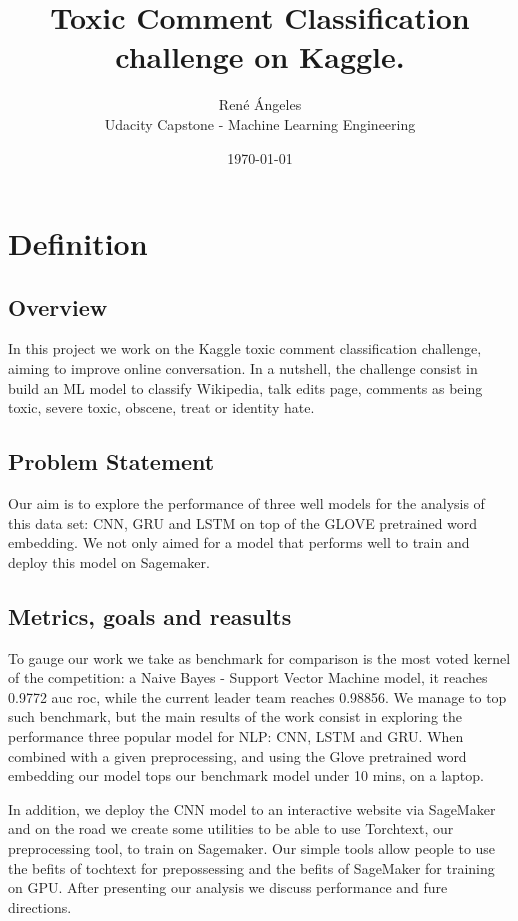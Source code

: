 \documentclass[book,preprintnumbers,11pt]{article}
\begin{document}
\title{Toxic Comment Classification challenge on Kaggle.}
\author{Ren\'e  \'Angeles\\
  Udacity Capstone - Machine Learning Engineering \\
  }
\date{\today}
\maketitle


\section{Definition}

\subsection{Overview}

In this project we work on the Kaggle toxic comment classification challenge, aiming to improve 
online conversation. In a nutshell, the challenge consist in build an ML model to classify 
Wikipedia, talk edits page, comments as being toxic, severe toxic, obscene, treat or identity hate.


\subsection{Problem Statement}

Our aim is to explore the performance of three well models for the analysis of
this data set: CNN, GRU and LSTM on top of the GLOVE pretrained word embedding. 
We not only aimed for a model that performs well to train and deploy this model 
on Sagemaker. 

\subsection{Metrics, goals and reasults}

To gauge our work we take as benchmark for comparison is the most voted
kernel of the competition: a Naive Bayes - Support Vector Machine model, it reaches 0.9772 auc roc,
while the current leader team reaches 0.98856. We manage to top such benchmark, but the main 
results of the work consist in exploring the performance three popular model for NLP:  CNN, LSTM and GRU.
When combined with a given preprocessing, and using the Glove pretrained word embedding our model tops 
our benchmark model under 10 mins, on a laptop.

In addition, we deploy the CNN model to an interactive website via SageMaker and on the road 
we create some utilities to be able to use Torchtext, our preprocessing tool, to train on Sagemaker. 
Our simple tools allow people to use the befits of tochtext for prepossessing and the befits of 
SageMaker for training on GPU. After presenting our analysis we discuss performance and 
fure directions. 
\end{document}
